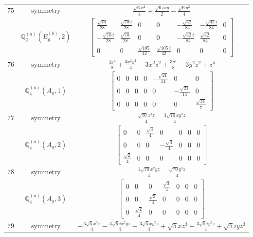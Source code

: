 \documentclass[fleqn,8pt,landscape]{jsarticle}
\begin{document}
\begin{longtable}{ccc}
$ 75 $ & $ \text{symmetry} $ & $ \frac{\sqrt{6} x^{2}}{4} + \frac{\sqrt{6} i x y}{2} - \frac{\sqrt{6} y^{2}}{4} $ \\
$  $ & $ \mathbb{Q}_{2}^{(a)}(E_{g}^{(b)},2) $ & $ \begin{bmatrix} \frac{\sqrt{70}}{28} & \frac{\sqrt{70} i}{28} & 0 & 0 & - \frac{\sqrt{42}}{84} & - \frac{\sqrt{42} i}{84} & 0 \\ - \frac{\sqrt{70} i}{28} & \frac{\sqrt{70}}{28} & 0 & 0 & - \frac{\sqrt{42} i}{84} & \frac{\sqrt{42}}{84} & 0 \\ 0 & 0 & \frac{\sqrt{105}}{42} & \frac{\sqrt{105} i}{42} & 0 & 0 & 0 \end{bmatrix} $ \\ \hline
$ 76 $ & $ \text{symmetry} $ & $ \frac{3 x^{4}}{8} + \frac{3 x^{2} y^{2}}{4} - 3 x^{2} z^{2} + \frac{3 y^{4}}{8} - 3 y^{2} z^{2} + z^{4} $ \\
$  $ & $ \mathbb{Q}_{4}^{(a)}(A_{g},1) $ & $ \begin{bmatrix} 0 & 0 & 0 & 0 & - \frac{\sqrt{21}}{14} & 0 & 0 \\ 0 & 0 & 0 & 0 & 0 & - \frac{\sqrt{21}}{14} & 0 \\ 0 & 0 & 0 & 0 & 0 & 0 & \frac{\sqrt{14}}{7} \end{bmatrix} $ \\ \hline
$ 77 $ & $ \text{symmetry} $ & $ \frac{\sqrt{70} x^{3} z}{4} - \frac{3 \sqrt{70} x y^{2} z}{4} $ \\
$  $ & $ \mathbb{Q}_{4}^{(a)}(A_{g},2) $ & $ \begin{bmatrix} 0 & 0 & \frac{\sqrt{3}}{4} & 0 & 0 & 0 & 0 \\ 0 & 0 & 0 & - \frac{\sqrt{3}}{4} & 0 & 0 & 0 \\ \frac{\sqrt{2}}{4} & 0 & 0 & 0 & 0 & 0 & 0 \end{bmatrix} $ \\ \hline
$ 78 $ & $ \text{symmetry} $ & $ \frac{3 \sqrt{70} x^{2} y z}{4} - \frac{\sqrt{70} y^{3} z}{4} $ \\
$  $ & $ \mathbb{Q}_{4}^{(a)}(A_{g},3) $ & $ \begin{bmatrix} 0 & 0 & 0 & \frac{\sqrt{3}}{4} & 0 & 0 & 0 \\ 0 & 0 & \frac{\sqrt{3}}{4} & 0 & 0 & 0 & 0 \\ 0 & \frac{\sqrt{2}}{4} & 0 & 0 & 0 & 0 & 0 \end{bmatrix} $ \\ \hline
$ 79 $ & $ \text{symmetry} $ & $ - \frac{3 \sqrt{5} x^{3} z}{4} - \frac{3 \sqrt{5} i x^{2} y z}{4} - \frac{3 \sqrt{5} x y^{2} z}{4} + \sqrt{5} x z^{3} - \frac{3 \sqrt{5} i y^{3} z}{4} + \sqrt{5} i y z^{3} $ \\

\end{longtable}
\end{document}
